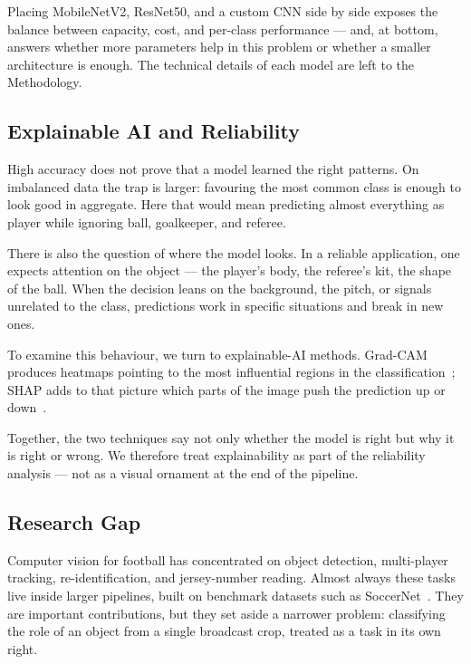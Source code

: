 \documentclass[preprint,12pt]{elsarticle}
\begin{document}
Placing MobileNetV2, ResNet50, and a custom CNN side by side exposes the balance between capacity, cost, and per-class performance --- and, at bottom, answers whether more parameters help in this problem or whether a smaller architecture is enough. The technical details of each model are left to the Methodology.

\subsection{Explainable AI and Reliability}

High accuracy does not prove that a model learned the right patterns. On imbalanced data the trap is larger: favouring the most common class is enough to look good in aggregate. Here that would mean predicting almost everything as player while ignoring ball, goalkeeper, and referee.

There is also the question of where the model looks. In a reliable application, one expects attention on the object --- the player's body, the referee's kit, the shape of the ball. When the decision leans on the background, the pitch, or signals unrelated to the class, predictions work in specific situations and break in new ones.

To examine this behaviour, we turn to explainable-AI methods. Grad-CAM produces heatmaps pointing to the most influential regions in the classification~\cite{selvaraju2020gradcam,chattopadhay2018gradcampp}; SHAP adds to that picture which parts of the image push the prediction up or down~\cite{lundberg2017unified,aldughayfiq2023retinoblastoma}.

Together, the two techniques say not only whether the model is right but why it is right or wrong. We therefore treat explainability as part of the reliability analysis --- not as a visual ornament at the end of the pipeline.

\subsection{Research Gap}
Computer vision for football has concentrated on object detection, multi-player tracking, re-identification, and jersey-number reading. Almost always these tasks live inside larger pipelines, built on benchmark datasets such as SoccerNet~\cite{giancola2018soccernet,deliege2021soccernetv2,somers2024multitask}. They are important contributions, but they set aside a narrower problem: classifying the role of an object from a single broadcast crop, treated as a task in its own right.
\end{document}
